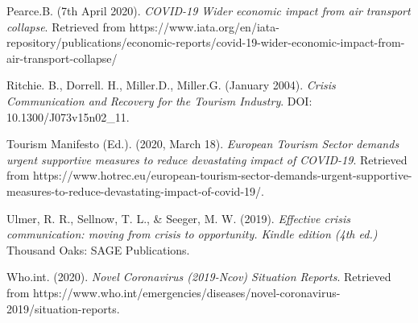 \begin{flushleft}
		Pearce.B. (7th April 2020). \textit{COVID-19 Wider economic impact from air transport collapse}. Retrieved from https://www.iata.org/en/iata-repository/publications/economic-reports/covid-19-wider-economic-impact-from-air-transport-collapse/

\newpage
\thispagestyle{plain}
		Ritchie. B., Dorrell. H., Miller.D., Miller.G. (January 2004). \textit{Crisis Communication and Recovery for the Tourism Industry}. DOI: 10.1300/J073v15n02\_11.

		Tourism Manifesto (Ed.). (2020, March 18). \textit{European Tourism Sector demands urgent supportive measures to reduce devastating impact of COVID-19}. Retrieved from https://www.hotrec.eu/european-tourism-sector-demands-urgent-supportive-measures-to-reduce-devastating-impact-of-covid-19/.

		Ulmer, R. R., Sellnow, T. L., \& Seeger, M. W. (2019). \textit{Effective crisis communication: moving from crisis to opportunity. Kindle edition (4th ed.)} Thousand Oaks: SAGE Publications.

		Who.int. (2020). \textit{Novel Coronavirus (2019-Ncov) Situation Reports}. Retrieved from https://www.who.int/emergencies/diseases/novel-coronavirus-2019/situation-reports.
\end{flushleft}
